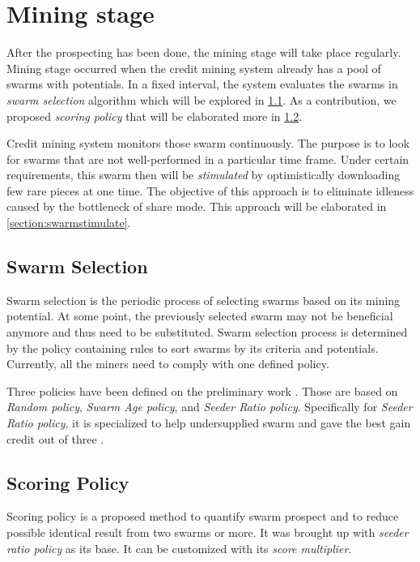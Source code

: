 \section{Mining stage}
After the prospecting has been done, the mining stage will take place regularly. Mining stage occurred when the credit mining system already has a pool of swarms with potentials. In a fixed interval, the system evaluates the swarms in \textit{swarm selection} algorithm which will be explored in \ref{section:swarmselect}. As a contribution, we proposed \textit{scoring policy} that will be elaborated more in \ref{section:scorepolicy}.

Credit mining system monitors those swarm continuously. The purpose is to look for swarms that are not well-performed in a particular time frame. Under certain requirements, this swarm then will be \textit{stimulated} by optimistically downloading few rare pieces at one time. The objective of this approach is to eliminate idleness caused by the bottleneck of share mode. This approach will be elaborated in \ref{section:swarmstimulate}.

\subsection{Swarm Selection}
\label{section:swarmselect}
Swarm selection is the periodic process of selecting swarms based on its mining potential. At some point, the previously selected swarm may not be beneficial anymore and thus need to be substituted. Swarm selection process is determined by the policy containing rules to sort swarms by its criteria and potentials. Currently, all the miners need to comply with one defined policy.

Three policies have been defined on the preliminary work \cite{2015:creditmining:capota}. Those are based on \textit{Random policy}, \textit{Swarm Age policy}, and \textit{Seeder Ratio policy}. Specifically for \textit{Seeder Ratio policy}, it is specialized to help undersupplied swarm and gave the best gain credit out of three \cite{2015:creditmining:capota}.

\subsection{Scoring Policy}
\label{section:scorepolicy}
Scoring policy is a proposed method to quantify swarm prospect and to reduce possible identical result from two swarms or more. It was brought up with \textit{seeder ratio policy} as its base. It can be customized with its \textit{score multiplier}.

